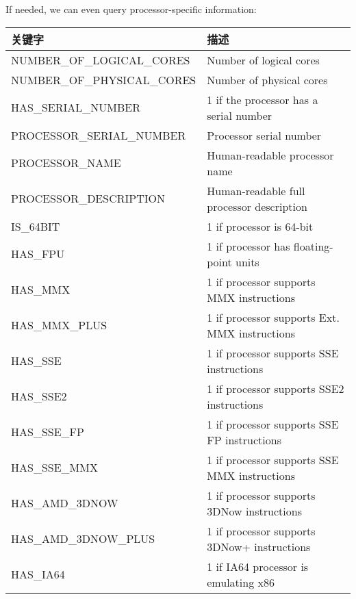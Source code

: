 If needed, we can even query processor-specific information:

\begin{longtable}{|l|l|}
\hline
\textbf{关键字}                & \textbf{描述}                                   \\ \hline
\endfirsthead
%
\endhead
%
NUMBER\_OF\_LOGICAL\_CORES  & Number of logical cores                       \\ \hline
NUMBER\_OF\_PHYSICAL\_CORES & Number of physical cores                      \\ \hline
HAS\_SERIAL\_NUMBER         & 1 if the processor has a serial number        \\ \hline
PROCESSOR\_SERIAL\_NUMBER   & Processor serial number                       \\ \hline
PROCESSOR\_NAME             & Human-readable processor name                 \\ \hline
PROCESSOR\_DESCRIPTION      & Human-readable full processor description     \\ \hline
IS\_64BIT                   & 1 if processor is 64-bit                      \\ \hline
HAS\_FPU                    & 1 if processor has floating-point units       \\ \hline
HAS\_MMX                    & 1 if processor supports MMX instructions      \\ \hline
HAS\_MMX\_PLUS              & 1 if processor supports Ext. MMX instructions \\ \hline
HAS\_SSE                    & 1 if processor supports SSE instructions      \\ \hline
HAS\_SSE2                   & 1 if processor supports SSE2 instructions     \\ \hline
HAS\_SSE\_FP                & 1 if processor supports SSE FP instructions   \\ \hline
HAS\_SSE\_MMX               & 1 if processor supports SSE MMX instructions  \\ \hline
HAS\_AMD\_3DNOW             & 1 if processor supports 3DNow instructions    \\ \hline
HAS\_AMD\_3DNOW\_PLUS       & 1 if processor supports 3DNow+ instructions   \\ \hline
HAS\_IA64                   & 1 if IA64 processor is emulating x86          \\ \hline
\end{longtable}

